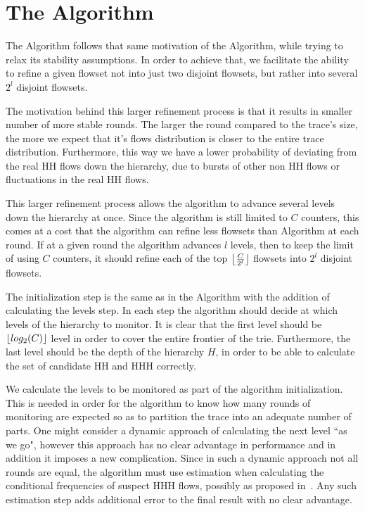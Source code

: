 \section{The \multipleAlgo Algorithm}
The \multipleAlgo Algorithm follows that same motivation of the \simpleAlgo Algorithm, while trying to relax its stability assumptions.
In order to achieve that, we facilitate the ability to refine a given flowset not into just two disjoint flowsets, but rather into several $2^l$ disjoint flowsets.

The motivation behind this larger refinement process is that it results in smaller number of more stable rounds. The larger the round compared to the trace's size, the more we expect that it's flows distribution is closer to the entire trace distribution. Furthermore, this way we have a lower probability of  deviating from the real HH flows down the hierarchy, due to bursts of other non HH flows or fluctuations in the real HH flows.

This larger refinement process allows the algorithm to advance several levels down the hierarchy at once. Since the algorithm is still limited to $C$ counters, this comes at a cost that the algorithm can refine less flowsets than \simpleAlgo Algorithm at each round. If at a given round the algorithm advances $l$ levels, then to keep the limit of using $C$ counters, it should refine each of the top $\left\lfloor \frac{C}{2^l} \right\rfloor$ flowsets into $2^l$ disjoint flowsets.

The initialization step is the same as in the \simpleAlgo Algorithm with the addition of calculating the levels step. In each step the algorithm should decide at which levels of the hierarchy to monitor. It is clear that the first level should be $\left\lfloor log_2(C) \right\rfloor$ level in order to cover the entire frontier of the trie. Furthermore, the last level should be the depth of the hierarchy $H$, in order to be able to calculate the set of candidate HH and HHH correctly.

We calculate the levels to be monitored as part of the algorithm initialization. This is needed in order for the algorithm to know how many rounds of monitoring are expected so as to partition the trace into an adequate number of parts. One might consider a dynamic approach of calculating the next level ``as we go", however this approach has no clear advantage in performance and in addition it imposes a new complication. Since in such a dynamic approach not all rounds are equal, the algorithm must use estimation when calculating the conditional frequencies of suspect HHH flows, possibly as proposed in~\cite{Zhang2004}. Any such estimation step adds additional error to the final result with no clear advantage.

